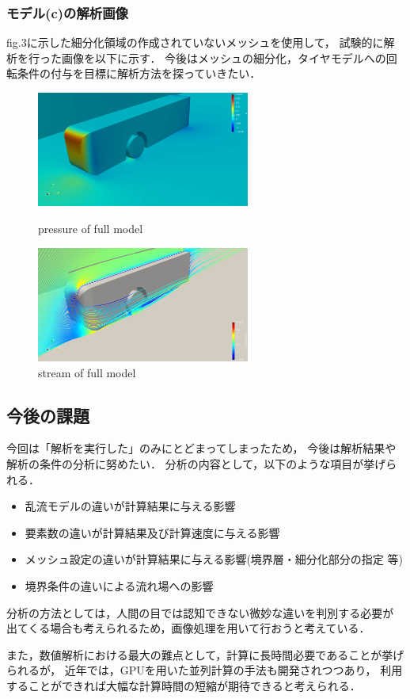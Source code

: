 \documentclass[twocolumn,a4j]{jsarticle}
\begin{document}
\subsubsection{モデル(c)の解析画像}
fig.3に示した細分化領域の作成されていないメッシュを使用して，
試験的に解析を行った画像を以下に示す．
今後はメッシュの細分化，タイヤモデルへの回転条件の付与を目標に解析方法を探っていきたい．
\begin{figure}[htbp]
    \begin{center}
        \includegraphics[width=70mm]{screenshots/fullmodel_pressure.png}
        \caption{pressure of full model}
        \includegraphics[width=70mm]{screenshots/fullmodel_stream.png}
        \caption{stream of full model}
    \end{center}
\end{figure}
\subsection{今後の課題}
今回は「解析を実行した」のみにとどまってしまったため，
今後は解析結果や解析の条件の分析に努めたい．
分析の内容として，以下のような項目が挙げられる．
\begin{itemize}
    \item 乱流モデルの違いが計算結果に与える影響
    \item 要素数の違いが計算結果及び計算速度に与える影響
    \item メッシュ設定の違いが計算結果に与える影響(境界層・細分化部分の指定 等)
    \item 境界条件の違いによる流れ場への影響
\end{itemize}
\par
分析の方法としては，人間の目では認知できない微妙な違いを判別する必要が
出てくる場合も考えられるため，画像処理を用いて行おうと考えている．
\par
また，数値解析における最大の難点として，計算に長時間必要であることが挙げられるが，
近年では，GPUを用いた並列計算の手法も開発されつつあり，
利用することができれば大幅な計算時間の短縮が期待できると考えられる．\\
\end{document}
